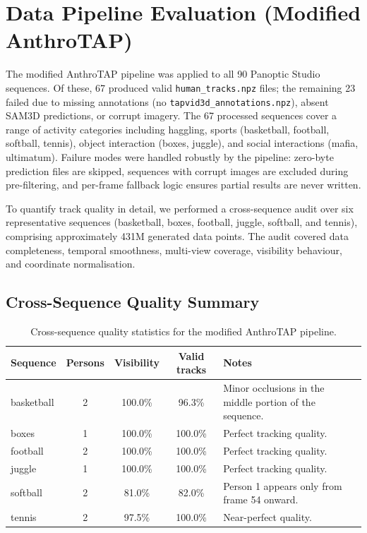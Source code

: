 \documentclass[12pt, a4paper, oneside]{report}
\begin{document}
\section{Data Pipeline Evaluation (Modified AnthroTAP)}
The modified AnthroTAP pipeline was applied to all 90 Panoptic Studio sequences. Of these, 67 produced valid \texttt{human\_tracks.npz} files; the remaining 23 failed due to missing annotations (no \texttt{tapvid3d\_annotations.npz}), absent SAM3D predictions, or corrupt imagery. The 67 processed sequences cover a range of activity categories including haggling, sports (basketball, football, softball, tennis), object interaction (boxes, juggle), and social interactions (mafia, ultimatum). Failure modes were handled robustly by the pipeline: zero-byte prediction files are skipped, sequences with corrupt images are excluded during pre-filtering, and per-frame fallback logic ensures partial results are never written.

To quantify track quality in detail, we performed a cross-sequence audit over six representative sequences (basketball, boxes, football, juggle, softball, and tennis), comprising approximately 431M generated data points. The audit covered data completeness, temporal smoothness, multi-view coverage, visibility behaviour, and coordinate normalisation.

\subsection{Cross-Sequence Quality Summary}
\begin{table}[htbp]
    \centering
    \begin{tabularx}{\textwidth}{lccc>{\raggedright\arraybackslash}X}
        \toprule
        Sequence & Persons & Visibility & Valid tracks & Notes \\
        \midrule
        basketball & 2 & 100.0\% & 96.3\% & Minor occlusions in the middle portion of the sequence. \\
        boxes      & 1 & 100.0\% & 100.0\% & Perfect tracking quality. \\
        football   & 2 & 100.0\% & 100.0\% & Perfect tracking quality. \\
        juggle     & 1 & 100.0\% & 100.0\% & Perfect tracking quality. \\
        softball   & 2 & 81.0\%  & 82.0\%  & Person 1 appears only from frame 54 onward. \\
        tennis     & 2 & 97.5\%  & 100.0\% & Near-perfect quality. \\
        \bottomrule
    \end{tabularx}
    \caption{Cross-sequence quality statistics for the modified AnthroTAP pipeline.}
    \label{tab:anthrotap_quality_summary}
\end{table}
\end{document}
